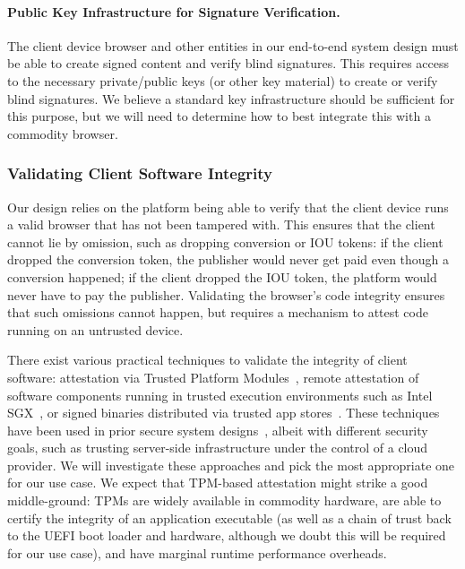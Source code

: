 \paragraph{Public Key Infrastructure for Signature Verification.}
%
The client device browser and other entities in our end-to-end system design must be able to create signed content and verify blind signatures.
%
This requires access to the necessary private/public keys (or other key material) to create or verify blind signatures.
%
We believe a standard key infrastructure should be sufficient for this purpose, but we will need to determine how to best integrate this with a commodity browser.
%

\subsubsection{Validating Client Software Integrity}
\label{s:attest}
%
Our design relies on the platform being able to verify that the client device runs a valid browser that has not been tampered with.
%
This ensures that the client cannot lie by omission, such as dropping conversion or IOU tokens: if the client dropped the conversion token, the publisher would never get paid even though a conversion happened; if the client dropped the IOU token, the platform would never have to pay the publisher.
%
Validating the browser's code integrity ensures that such omissions cannot happen, but requires a mechanism to attest code running on an untrusted device.
%

%
There exist various practical techniques to validate the integrity of client software: attestation via Trusted Platform Modules~\cite{tpm}, remote attestation of software components running in trusted execution environments such as Intel SGX~\cite{sgx}, or signed binaries distributed via trusted app stores~\cite{ios-security}.
%
These techniques have been used in prior secure system designs~\cite{riverbed, ryoan}, albeit with different security goals, such as trusting server-side infrastructure under the control of a cloud provider.
%
We will investigate these approaches and pick the most appropriate one for our use case.
%
We expect that TPM-based attestation might strike a good middle-ground: TPMs are widely available in commodity hardware, are able to certify the integrity of an application executable (as well as a chain of trust back to the UEFI boot loader and hardware, although we doubt this will be required for our use case), and have marginal runtime performance overheads.
%

